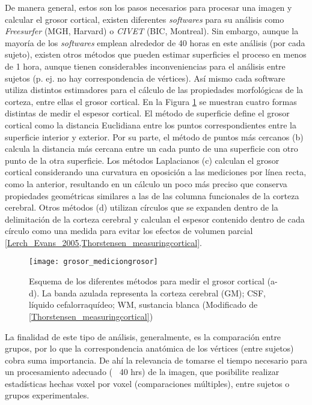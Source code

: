 De manera general, estos son los pasos necesarios para procesar una imagen y calcular el grosor
cortical, existen diferentes \textit{softwares} para su análisis como \textit{Freesurfer} (MGH, Harvard) o \textit{CIVET} (BIC, Montreal). Sin embargo, aunque la mayoría de los \textit{softwares} emplean alrededor de 40 horas en este análisis (por cada sujeto), existen otros métodos que pueden estimar superficies el proceso en menos de 1 hora, aunque tienen considerables inconveniencias para el análisis entre sujetos (p. ej. no hay correspondencia de vértices). Así mismo cada software utiliza distintos estimadores para el cálculo de las propiedades morfológicas de la corteza, entre ellas el grosor cortical. En la Figura \ref{fig:grosor_mediciongrosor} se muestran cuatro formas distintas de medir el espesor cortical. El método de superficie define el grosor cortical como la distancia Euclidiana entre los puntos correspondientes entre la superficie interior y exterior. Por su parte, el método de puntos más cercanos (b) calcula la distancia más cercana entre un cada punto de una superficie con otro punto de la otra superficie. Los métodos Laplacianos (c) calculan el grosor cortical considerando una curvatura en oposición a las mediciones por línea recta, como la anterior, resultando en un cálculo un poco más preciso que conserva propiedades geométricas similares a las de las columna funcionales de la corteza cerebral. Otros métodos (d) utilizan círculos que se expanden dentro de la delimitación de la corteza cerebral y calculan el espesor contenido dentro de cada círculo como una medida para evitar los efectos de volumen parcial \ref{Lerch_Evans_2005,Thorstensen_measuringcortical}.


\begin{figure}[htb]
\begin{figg}
   \texttt{[image: grosor\_mediciongrosor]}
   \caption{Esquema de los diferentes métodos para medir el grosor cortical (a-d). La banda azulada representa la corteza cerebral (GM); CSF, líquido cefalorraquídeo; WM, sustancia blanca (Modificado de \ref{Thorstensen_measuringcortical})
}
 \label{fig:grosor_mediciongrosor}
 \end{figg}
\end{figure}



La finalidad de este tipo de análisis, generalmente, es la comparación entre grupos, por lo que la
correspondencia anatómica de los vértices (entre sujetos) cobra suma importancia. De ahí la relevancia
de tomarse el tiempo necesario para un procesamiento adecuado (~ 40 hrs) de la imagen, que posibilite
realizar estadísticas hechas voxel por voxel (comparaciones múltiples), entre sujetos o grupos
experimentales.

